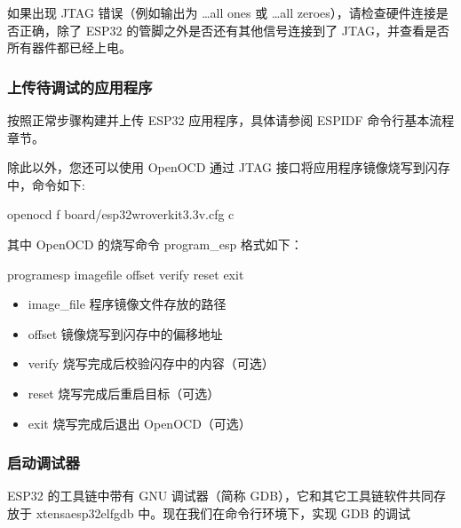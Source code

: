 \documentclass[a4paper,12pt,english]{sphinxmanual}
\begin{document}
\sphinxAtStartPar
如果出现 JTAG 错误（例如输出为 …all ones 或 …all zeroes），请检查硬件连接是否正确，除了 ESP32 的管脚之外是否还有其他信号连接到了 JTAG，并查看是否所有器件都已经上电。


\subsubsection{上传待调试的应用程序}
\label{\detokenize{exp-esp32/ide/esp-idf-cli-debug:id5}}
\sphinxAtStartPar
按照正常步骤构建并上传 ESP32 应用程序，具体请参阅 ESP\sphinxhyphen{}IDF 命令行基本流程 章节。

\sphinxAtStartPar
除此以外，您还可以使用 OpenOCD 通过 JTAG 接口将应用程序镜像烧写到闪存中，命令如下:

\begin{sphinxVerbatim}[commandchars=\\\{\}]
openocd \PYGZhy{}f board/esp32\PYGZhy{}wrover\PYGZhy{}kit\PYGZhy{}3.3v.cfg \PYGZhy{}c 
\end{sphinxVerbatim}

\sphinxAtStartPar
其中 OpenOCD 的烧写命令 program\_esp 格式如下：

\begin{sphinxVerbatim}[commandchars=\\\{\}]
program\PYGZus{}esp \PYGZlt{}image\PYGZus{}file\PYGZgt{} \PYGZlt{}offset\PYGZgt{} \PYG{o}{[}verify\PYG{o}{]} \PYG{o}{[}reset\PYG{o}{]} \PYG{o}{[}exit\PYG{o}{]}
\end{sphinxVerbatim}
\begin{itemize}
\item {} 
\sphinxAtStartPar
image\_file \sphinxhyphen{} 程序镜像文件存放的路径

\item {} 
\sphinxAtStartPar
offset \sphinxhyphen{} 镜像烧写到闪存中的偏移地址

\item {} 
\sphinxAtStartPar
verify \sphinxhyphen{} 烧写完成后校验闪存中的内容（可选）

\item {} 
\sphinxAtStartPar
reset \sphinxhyphen{} 烧写完成后重启目标（可选）

\item {} 
\sphinxAtStartPar
exit \sphinxhyphen{} 烧写完成后退出 OpenOCD（可选）

\end{itemize}


\subsubsection{启动调试器}
\label{\detokenize{exp-esp32/ide/esp-idf-cli-debug:id6}}
\sphinxAtStartPar
ESP32 的工具链中带有 GNU 调试器（简称 GDB），它和其它工具链软件共同存放于 xtensa\sphinxhyphen{}esp32\sphinxhyphen{}elf\sphinxhyphen{}gdb 中。现在我们在命令行环境下，实现 GDB 的调试
\end{document}

